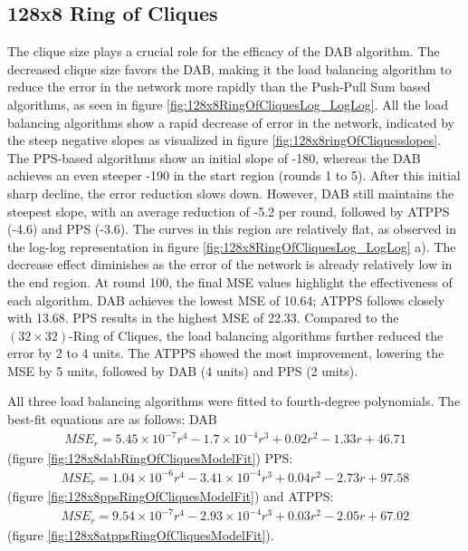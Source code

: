 \subsection{128x8 Ring of Cliques}\label{subsec:128_8ROC}
The clique size plays a crucial role for the efficacy of the DAB algorithm. The decreased clique size favors the DAB, making it the load balancing algorithm to reduce the error in the network more rapidly than the Push-Pull Sum based algorithms, as seen in figure \ref{fig:128x8RingOfCliquesLog_LogLog}. All the load balancing algorithms show a rapid decrease of error in the network, indicated by the steep negative slopes as visualized in figure \ref{fig:128x8ringOfCliquesslopes}. The PPS-based algorithms show an initial slope of -180, whereas the DAB achieves an even steeper -190 in the start region (rounds 1 to 5). After this initial sharp decline, the error reduction slows down. However, DAB still maintains the steepest slope, with an average reduction of -5.2 per round, followed by ATPPS (-4.6) and PPS (-3.6). The curves in this region are relatively flat, as observed in the log-log representation in figure \ref{fig:128x8RingOfCliquesLog_LogLog} a). The decrease effect diminishes as the error of the network is already relatively low in the end region. At round 100, the final MSE values highlight the effectiveness of each algorithm. DAB achieves the lowest MSE of 10.64; ATPPS follows closely with 13.68. PPS results in the highest MSE of 22.33. Compared to the $(32 \times 32)$-Ring of Cliques, the load balancing algorithms further reduced the error by 2 to 4 units. The ATPPS showed the most improvement, lowering the MSE by 5 units, followed by DAB (4 units) and PPS (2 units).

All three load balancing algorithms were fitted to fourth-degree polynomials. The best-fit equations are as follows: DAB
\begin{align}
    MSE_r=5.45\times 10 ^{-7}r^{4}-1.7\times 10^{-4}r^{3}+0.02r^{2}-1.33r+46.71    
\end{align}
(figure \ref{fig:128x8dabRingOfCliquesModelFit}) PPS:
\begin{align}
    MSE_r=1.04\times 10 ^{-6}r^{4}-3.41\times 10^{-4}r^{3}+0.04r^{2}-2.73r+97.58    
\end{align}
(figure \ref{fig:128x8ppsRingOfCliquesModelFit}) and ATPPS:
\begin{align}
    MSE_r=9.54\times 10^{-7}r^{4}-2.93\times 10^{-4}r^{3}+0.03r^{2}-2.05r+67.02    
\end{align}
(figure \ref{fig:128x8atppsRingOfCliquesModelFit}).

